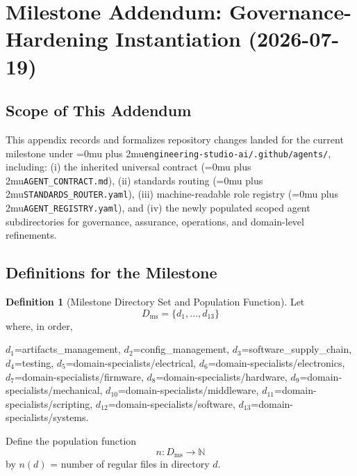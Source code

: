\documentclass[12pt]{article}
\theoremstyle{definition}
\newtheorem{definition}[theorem]{Definition}
\DeclareRobustCommand{\code}[1]{\begingroup\Urlmuskip=0mu plus 2mu\relax\nolinkurl{#1}\endgroup}
\begin{document}
\section{Milestone Addendum: Governance-Hardening Instantiation (2026-07-19)}
\label{app:milestone-20260719}

\subsection{Scope of This Addendum}

This appendix records and formalizes repository changes landed for the
current milestone under \code{engineering-studio-ai/.github/agents/},
including: (i) the inherited universal contract
(\code{AGENT\_CONTRACT.md}), (ii) standards routing
(\code{STANDARDS\_ROUTER.yaml}), (iii) machine-readable role registry
(\code{AGENT\_REGISTRY.yaml}), and (iv) the newly populated scoped
agent subdirectories for governance, assurance, operations, and
domain-level refinements.

\subsection{Definitions for the Milestone}

\begin{definition}[Milestone Directory Set and Population Function]
\label{def:milestone-dirs}
Let
\begin{equation*}
      D_{\mathrm{ms}} = \{
      d_1,\ldots,d_{13}
      \}
\end{equation*}
where, in order,
\begin{sloppypar}
$d_1$=artifacts\_management,
$d_2$=config\_management,
$d_3$=software\_supply\_chain,
$d_4$=testing,
$d_5$=domain-specialists/electrical,
$d_6$=domain-specialists/electronics,
$d_7$=domain-specialists/firmware,
$d_8$=domain-specialists/hardware,
$d_9$=domain-specialists/mechanical,
$d_{10}$=domain-specialists/middleware,
$d_{11}$=domain-specialists/scripting,
$d_{12}$=domain-specialists/software,
$d_{13}$=domain-specialists/systems.
\end{sloppypar}
Define the population function
\begin{equation*}
      n : D_{\mathrm{ms}} \to \mathbb{N}
\end{equation*}
by $n(d)$ = number of regular files in directory $d$.
\end{definition}
\end{document}
